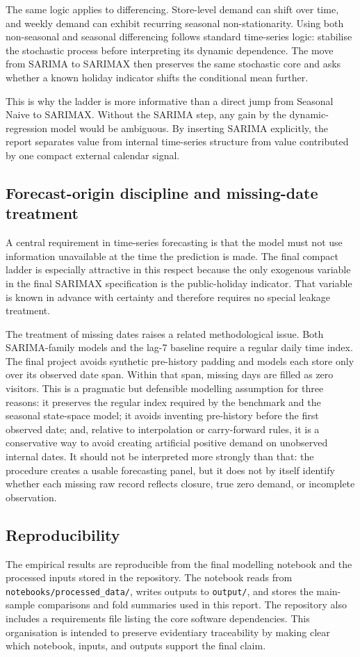 \documentclass[11pt,oneside]{scrartcl}
\begin{document}
The same logic applies to differencing. Store-level demand can shift over time, and weekly demand can exhibit recurring seasonal non-stationarity. Using both non-seasonal and seasonal differencing follows standard time-series logic: stabilise the stochastic process before interpreting its dynamic dependence. The move from SARIMA to SARIMAX then preserves the same stochastic core and asks whether a known holiday indicator shifts the conditional mean further.

This is why the ladder is more informative than a direct jump from Seasonal Naive to SARIMAX. Without the SARIMA step, any gain by the dynamic-regression model would be ambiguous. By inserting SARIMA explicitly, the report separates value from internal time-series structure from value contributed by one compact external calendar signal.

\subsection{Forecast-origin discipline and missing-date treatment}
A central requirement in time-series forecasting is that the model must not use information unavailable at the time the prediction is made. The final compact ladder is especially attractive in this respect because the only exogenous variable in the final SARIMAX specification is the public-holiday indicator. That variable is known in advance with certainty and therefore requires no special leakage treatment.

The treatment of missing dates raises a related methodological issue. Both SARIMA-family models and the lag-7 baseline require a regular daily time index. The final project avoids synthetic pre-history padding and models each store only over its observed date span. Within that span, missing days are filled as zero visitors. This is a pragmatic but defensible modelling assumption for three reasons: it preserves the regular index required by the benchmark and the seasonal state-space model; it avoids inventing pre-history before the first observed date; and, relative to interpolation or carry-forward rules, it is a conservative way to avoid creating artificial positive demand on unobserved internal dates. It should not be interpreted more strongly than that: the procedure creates a usable forecasting panel, but it does not by itself identify whether each missing raw record reflects closure, true zero demand, or incomplete observation.

\subsection{Reproducibility}
The empirical results are reproducible from the final modelling notebook and the processed inputs stored in the repository. The notebook reads from \texttt{notebooks/processed\_data/}, writes outputs to \texttt{output/}, and stores the main-sample comparisons and fold summaries used in this report. The repository also includes a requirements file listing the core software dependencies. This organisation is intended to preserve evidentiary traceability by making clear which notebook, inputs, and outputs support the final claim.
\end{document}

